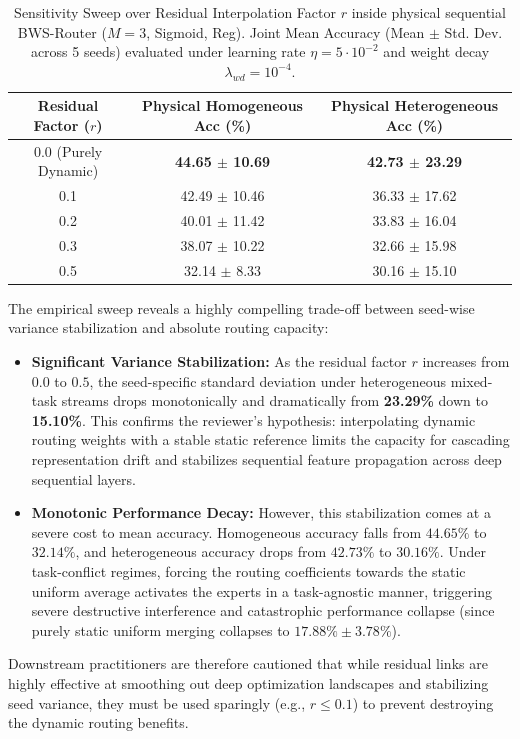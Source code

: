 \begin{table}[t]
\caption{Sensitivity Sweep over Residual Interpolation Factor $r$ inside physical sequential BWS-Router ($M=3$, Sigmoid, Reg). Joint Mean Accuracy (Mean $\pm$ Std. Dev. across 5 seeds) evaluated under learning rate $\eta = 5 \cdot 10^{-2}$ and weight decay $\lambda_{wd} = 10^{-4}$.}
\label{tab:residual_routing}
\vskip 0.15in
\begin{center}
\begin{small}
\begin{tabular}{ccc}
\toprule
\textbf{Residual Factor ($r$)} & \textbf{Physical Homogeneous Acc (\%)} & \textbf{Physical Heterogeneous Acc (\%)} \\
\midrule
0.0 (Purely Dynamic) & \textbf{44.65 $\pm$ 10.69} & \textbf{42.73 $\pm$ 23.29} \\
0.1                  & 42.49 $\pm$ 10.46 & 36.33 $\pm$ 17.62 \\
0.2                  & 40.01 $\pm$ 11.42 & 33.83 $\pm$ 16.04 \\
0.3                  & 38.07 $\pm$ 10.22 & 32.66 $\pm$ 15.98 \\
0.5                  & 32.14 $\pm$ 8.33  & 30.16 $\pm$ 15.10 \\
\bottomrule
\end{tabular}
\end{small}
\end{center}
\vskip -0.1in
\end{table}

The empirical sweep reveals a highly compelling trade-off between seed-wise variance stabilization and absolute routing capacity:
\begin{itemize}
    \item \textbf{Significant Variance Stabilization:} As the residual factor $r$ increases from $0.0$ to $0.5$, the seed-specific standard deviation under heterogeneous mixed-task streams drops monotonically and dramatically from \textbf{23.29\%} down to \textbf{15.10\%}. This confirms the reviewer's hypothesis: interpolating dynamic routing weights with a stable static reference limits the capacity for cascading representation drift and stabilizes sequential feature propagation across deep sequential layers.
    \item \textbf{Monotonic Performance Decay:} However, this stabilization comes at a severe cost to mean accuracy. Homogeneous accuracy falls from $44.65\%$ to $32.14\%$, and heterogeneous accuracy drops from $42.73\%$ to $30.16\%$. Under task-conflict regimes, forcing the routing coefficients towards the static uniform average activates the experts in a task-agnostic manner, triggering severe destructive interference and catastrophic performance collapse (since purely static uniform merging collapses to $17.88\% \pm 3.78\%$).
\end{itemize}
Downstream practitioners are therefore cautioned that while residual links are highly effective at smoothing out deep optimization landscapes and stabilizing seed variance, they must be used sparingly (e.g., $r \le 0.1$) to prevent destroying the dynamic routing benefits.

